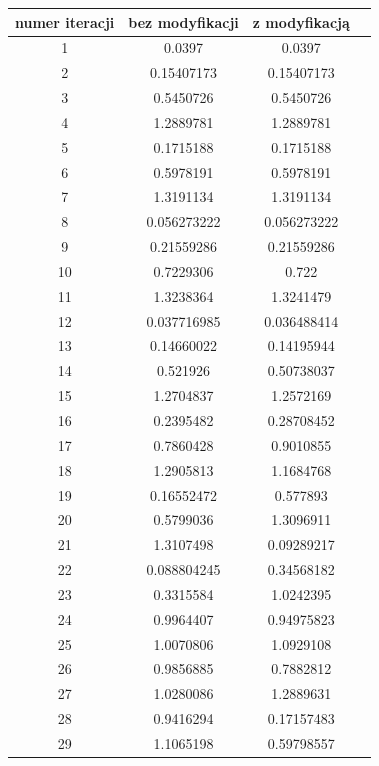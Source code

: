 \documentclass[]{article}
\begin{document}
	\begin{table}[!h]
		\centering
		\label{tab:table1}
		\begin{tabular}{|c|c|c|c|}
			\hline
			numer iteracji & bez modyfikacji & z modyfikacją \\
			\hline
			1 & 0.0397       & 0.0397 \\ \hline
			2 & 0.15407173   & 0.15407173 \\ \hline
			3 & 0.5450726    & 0.5450726 \\ \hline
			4 & 1.2889781    & 1.2889781 \\ \hline
			5 & 0.1715188    & 0.1715188 \\ \hline
			6 & 0.5978191    & 0.5978191 \\ \hline
			7 & 1.3191134    & 1.3191134 \\ \hline
			8 & 0.056273222  & 0.056273222 \\ \hline
			9 & 0.21559286   & 0.21559286 \\ \hline
			10 & 0.7229306    & 0.722 \\ \hline
			11 & 1.3238364    & 1.3241479 \\ \hline
			12 & 0.037716985  & 0.036488414 \\ \hline
			13 & 0.14660022   & 0.14195944 \\ \hline
			14 & 0.521926     & 0.50738037 \\ \hline
			15 & 1.2704837    & 1.2572169 \\ \hline
			16 & 0.2395482    & 0.28708452 \\ \hline
			17 & 0.7860428    & 0.9010855 \\ \hline
			18 & 1.2905813    & 1.1684768 \\ \hline
			19 & 0.16552472   & 0.577893 \\ \hline
			20 & 0.5799036    & 1.3096911 \\ \hline
			21 & 1.3107498    & 0.09289217 \\ \hline
			22 & 0.088804245  & 0.34568182 \\ \hline
			23 & 0.3315584    & 1.0242395 \\ \hline
			24 & 0.9964407    & 0.94975823 \\ \hline
			25 & 1.0070806    & 1.0929108 \\ \hline
			26 & 0.9856885    & 0.7882812 \\ \hline
			27 & 1.0280086    & 1.2889631 \\ \hline
			28 & 0.9416294    & 0.17157483 \\ \hline
			29 & 1.1065198    & 0.59798557 \\ \hline

\end{tabular}
\end{table}
\end{document}
